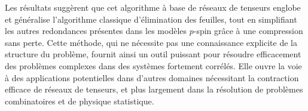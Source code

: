 Les résultats suggèrent que cet algorithme à base de réseaux de tenseurs englobe et généralise l'algorithme classique d'élimination des feuilles, tout en simplifiant les autres redondances présentes dans les modèles $p$-spin grâce à une compression sans perte.
Cette méthode, qui ne nécessite pas une connaissance explicite de la structure du problème, fournit ainsi un outil puissant pour résoudre efficacement des problèmes complexes dans des systèmes fortement corrélés.
Elle ouvre la voie à des applications potentielles dans d'autres domaines nécessitant la contraction efficace de réseaux de tenseurs, et plus largement dans la résolution de problèmes combinatoires et de physique statistique.
